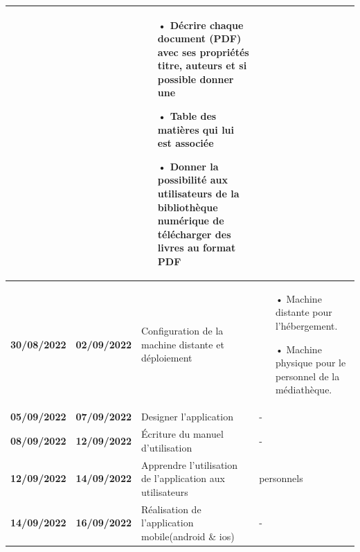 \documentclass[12pt,a4paper]{article}
\begin{document}
\begin{center}
\begin{tabular}{|c|c|p{6cm}|p{4.5cm}|}
\hline 
 &  & \begin{itemize}
\item[•] Décrire chaque document (PDF) avec ses propriétés titre, auteurs et si possible donner une
\item[•] Table des matières qui lui est associée
\item[•] Donner la possibilité aux utilisateurs de la bibliothèque numérique de télécharger des livres au
format PDF
\end{itemize} & \\
\hline 
\textbf{30/08/2022} & \textbf{02/09/2022} & Configuration de la machine distante et déploiement & 
\begin{itemize}
\item[•] Machine distante pour l'hébergement.
\item[•] Machine physique pour le personnel de la médiathèque.
\end{itemize} \\
\hline 
\textbf{05/09/2022} & \textbf{07/09/2022} & Designer l'application & - \\
\hline 
\textbf{08/09/2022} & \textbf{12/09/2022} & Écriture du manuel d'utilisation & - \\ 
\hline
\textbf{12/09/2022} & \textbf{14/09/2022} & Apprendre l'utilisation de l'application aux utilisateurs & personnels\\ 
\hline  
\textbf{14/09/2022} & \textbf{16/09/2022} & Réalisation de l'application mobile(android \& ios) & -\\ 
\hline 
\end{tabular} 
\end{center}
\end{document}
